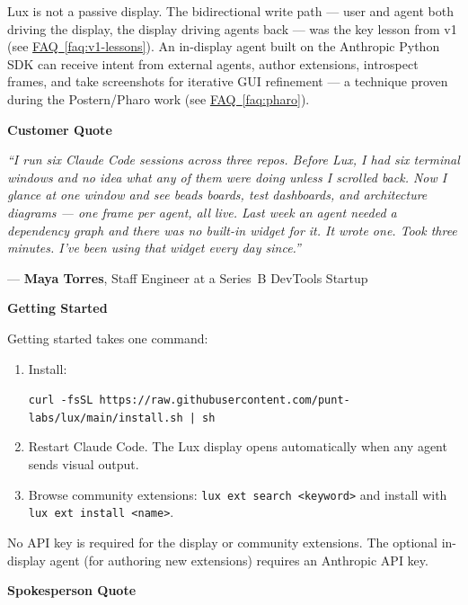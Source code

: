 \documentclass[11pt,letterpaper]{article}
\newcommand{\prsection}[1]{%
  \vspace{1em}%
  {\large\bfseries\color{SectionBlue}#1}%
  \vspace{0.3em}\par%
}
\newcommand{\faqref}[1]{\hyperref[#1]{FAQ~\ref*{#1}}}
\begin{document}
Lux is not a passive display.  The bidirectional write path --- user and
agent both driving the display, the display driving agents back --- was the
key lesson from v1 (see \faqref{faq:v1-lessons}).  An in-display agent
built on the Anthropic Python SDK can receive intent from external agents,
author extensions, introspect frames, and take screenshots for iterative GUI
refinement --- a technique proven during the Postern/Pharo
work\cite{postern2026,claudeagentsdk2026} (see \faqref{faq:pharo}).

\prsection{Customer Quote}

\begin{customerquote}
\textit{``I run six Claude Code sessions across three repos.  Before Lux, I
had six terminal windows and no idea what any of them were doing unless I
scrolled back.  Now I glance at one window and see beads boards, test
dashboards, and architecture diagrams --- one frame per agent, all live.
Last week an agent needed a dependency graph and there was no built-in
widget for it.  It wrote one.  Took three minutes.  I've been using that
widget every day since.''}

\raggedleft --- \textbf{Maya Torres}, Staff Engineer at a Series~B DevTools Startup
\end{customerquote}

\prsection{Getting Started}

Getting started takes one command:

\begin{enumerate}[nosep]
  \item Install:

    {\small\texttt{curl -fsSL https://raw.githubusercontent.com/\allowbreak punt-labs/lux/main/install.sh | sh}}
  \item Restart Claude Code.  The Lux display opens automatically when any
    agent sends visual output.
  \item Browse community extensions:
    {\small\texttt{lux ext search <keyword>}} and install with
    {\small\texttt{lux ext install <name>}}.
\end{enumerate}

No API key is required for the display or community extensions.  The
optional in-display agent (for authoring new extensions) requires an
Anthropic API key.

\prsection{Spokesperson Quote}
\end{document}
